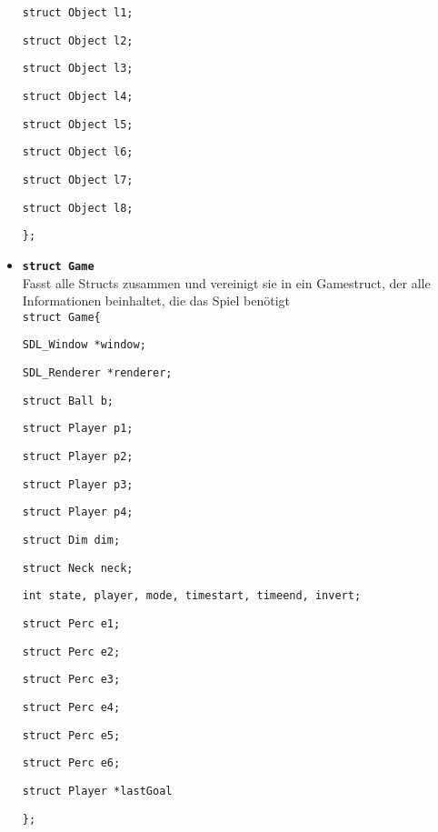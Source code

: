 \documentclass[a4paper, 10pt]{article}
\begin{document}
\begin{itemize}
\texttt{struct Object l1;}

\quad \texttt{struct Object l2;}

\quad \texttt{struct Object l3;}

\quad \texttt{struct Object l4;}

\quad \texttt{struct Object l5;}

\quad \texttt{struct Object l6;}

\quad \texttt{struct Object l7;}

\quad \texttt{struct Object l8;}

\texttt{\};}

\item \texttt{{\bf struct Game}}\\
Fasst alle Structs zusammen und vereinigt sie in ein Gamestruct, der alle Informationen beinhaltet, die das Spiel benötigt\medskip\\
\texttt{struct Game\{}

\quad \texttt{SDL\_Window *window;}

\quad \texttt{SDL\_Renderer *renderer;}

\quad \texttt{struct Ball b;}

\quad \texttt{struct Player p1;}

\quad \texttt{struct Player p2;}

\quad \texttt{struct Player p3;}

\quad \texttt{struct Player p4;}

\quad \texttt{struct Dim dim;}

\quad \texttt{struct Neck neck;}

\quad \texttt{int state, player, mode, timestart, timeend, invert;}

\quad \texttt{struct Perc e1;}

\quad \texttt{struct Perc e2;}

\quad \texttt{struct Perc e3;}

\quad \texttt{struct Perc e4;}

\quad \texttt{struct Perc e5;}

\quad \texttt{struct Perc e6;}

\quad \texttt{struct Player *lastGoal}

\texttt{\};}
\end{itemize}
\end{document}
